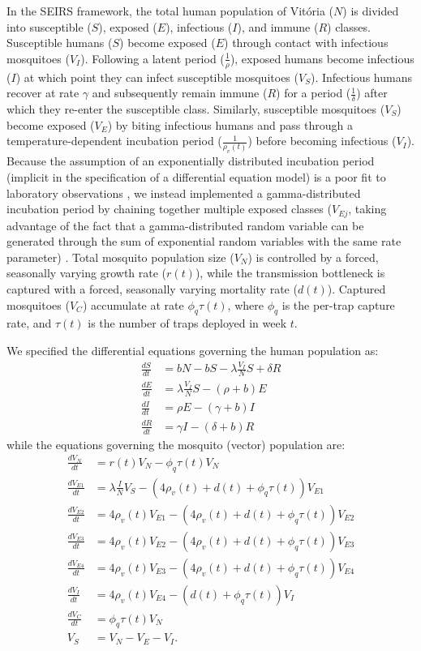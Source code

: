 \documentclass[10pt,letterpaper]{article}
\begin{document}
In the SEIRS framework, the total human population of Vit\'oria ($N$) is divided into susceptible ($S$), exposed ($E$), infectious ($I$), and immune ($R$) classes. 
Susceptible humans ($S$) become exposed ($E$) through contact with infectious mosquitoes ($V_I$).
Following a latent period ($\frac{1}{\rho}$), exposed humans become infectious ($I$) at which point they can infect susceptible mosquitoes ($V_S$).
Infectious humans recover at rate $\gamma$ and subsequently remain immune ($R$) for a period ($\frac{1}{\delta}$) after which they re-enter the susceptible class.
Similarly, susceptible mosquitoes ($V_S$) become exposed ($V_E$) by biting infectious humans and pass through a temperature-dependent incubation period ($\frac{1}{\rho_{v}(t)}$) before becoming infectious ($V_I$).
Because the assumption of an exponentially distributed incubation period (implicit in the specification of a differential equation model) is a poor fit to laboratory observations \cite{Chan2012}, we instead implemented a gamma-distributed incubation period by chaining together multiple exposed classes ($V_{Ej}$, taking advantage of the fact that a gamma-distributed random variable can be generated through the sum of exponential random variables with the same rate parameter) \cite{Lloyd2001}.
Total mosquito population size ($V_N$) is controlled by a forced, seasonally varying growth rate ($r(t)$), while the transmission bottleneck is captured with a forced, seasonally varying mortality rate ($d(t)$).
Captured mosquitoes ($V_C$) accumulate at rate $\phi_q \tau(t)$, where $\phi_q$ is the per-trap capture rate, and $\tau(t)$ is the number of traps deployed in week $t$.

We specified the differential equations governing the human population as:
\begin{align} 
\frac{dS}{dt} &= bN - bS - \lambda \frac{V_{I}}{N} S + \delta R\\
\frac{dE}{dt} &= \lambda \frac{V_{I}}{N} S - (\rho + b)E\\
\frac{dI}{dt} &= \rho E - (\gamma + b)I\\
\frac{dR}{dt} &= \gamma I - (\delta + b)R
\end{align}
while the equations governing the mosquito (vector) population are:
\begin{align}
\frac{dV_N}{dt} & = r(t) V_N - \phi_q \tau(t) V_N \\
\frac{dV_{E1}}{dt} &= \lambda \frac{I}{N} V_S - (4\rho_{v}(t) + d(t) + \phi_q \tau(t))V_{E1}\\
\frac{dV_{E2}}{dt} &= 4\rho_{v}(t) V_{E1} - (4\rho_{v}(t) + d(t) + \phi_q \tau(t))V_{E2}\\
\frac{dV_{E3}}{dt} &= 4\rho_{v}(t) V_{E2}  - (4\rho_{v}(t) + d(t) + \phi_q \tau(t))V_{E3}\\
\frac{dV_{E4}}{dt} &= 4\rho_{v}(t) V_{E3}  - (4\rho_{v}(t) + d(t) + \phi_q \tau(t))V_{E4}\\
\frac{dV_I}{dt} &= 4\rho_{v}(t) V_{E4} - (d(t) + \phi_q \tau(t)) V_I\\
\frac{dV_C}{dt} & = \phi_q \tau(t) V_N\\
V_S &= V_N - V_E - V_I.
\end{align}
\end{document}
